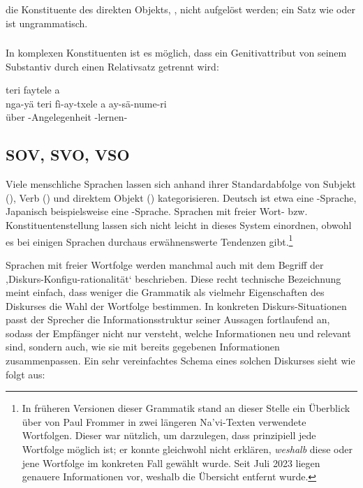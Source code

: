\noindent die Konstituente des direkten Objekts, , nicht aufgelöst werden; ein Satz wie  oder  ist ungrammatisch.

\subsubsection{} In komplexen Konstituenten ist es möglich, dass ein Genitivattribut von seinem Substantiv durch einen Relativsatz getrennt wird: \\

\begin{interlin}
	\glll {} teri faytele a  \\
	nga-yä teri fì-ay-txele a ay-sä-nume-ri \\
	 über -Angelegenheit  -lernen- \\
\end{interlin}

\subsection{SOV, SVO, VSO} Viele menschliche Sprachen lassen sich anhand ihrer Standardabfolge von Subjekt (), Verb () und direktem Objekt () kategorisieren. Deutsch ist etwa eine -Sprache, Japanisch beispielsweise eine -Sprache. Sprachen mit freier Wort- bzw. Konstituentenstellung lassen sich nicht leicht in dieses System einordnen, obwohl es bei einigen Sprachen durchaus erwähnenswerte Tendenzen gibt.\footnote{In früheren Versionen dieser Grammatik stand an dieser Stelle ein Überblick über von Paul Frommer in zwei längeren Na'vi-Texten verwendete Wortfolgen. Dieser war nützlich, um darzulegen, dass prinzipiell jede Wortfolge möglich ist; er konnte gleichwohl nicht erklären, \textit{weshalb} diese oder jene Wortfolge im konkreten Fall gewählt wurde. Seit Juli 2023 liegen genauere Informationen vor, weshalb die Übersicht entfernt wurde.} 

Sprachen mit freier Wortfolge werden manchmal auch mit dem Begriff der ,Diskurs-Konfigu-rationalität‘ beschrieben. Diese recht technische Bezeichnung meint einfach, dass weniger die Grammatik als vielmehr Eigenschaften des Diskurses die Wahl der Wortfolge bestimmen. In konkreten Diskurs-Situationen passt der Sprecher die Informationsstruktur seiner Aussagen fortlaufend an, sodass der Empfänger nicht nur versteht, welche Informationen neu und relevant sind, sondern auch, wie sie mit bereits gegebenen Informationen zusammenpassen. Ein sehr vereinfachtes Schema eines solchen Diskurses sieht wie folgt aus:


